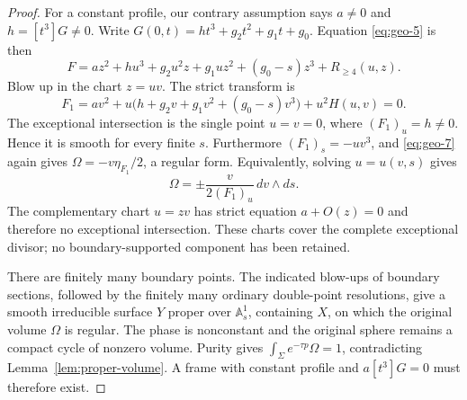 \begin{proof}
For a constant profile, our contrary assumption says \(a\neq0\) and
\(h=[t^3]G\neq0\). Write
\(G(0,t)=ht^3+g_2t^2+g_1t+g_0\).
Equation \eqref{eq:geo-5} is then
\begin{equation}\label{eq:geo-9}
F=az^2+hu^3+g_2u^2z+g_1uz^2+(g_0-s)z^3+R_{\geq4}(u,z).
\end{equation}
Blow up in the chart \(z=uv\). The strict transform is
\begin{equation}\label{eq:geo-10}
F_1=av^2+u\bigl(h+g_2v+g_1v^2+(g_0-s)v^3\bigr)
          +u^2H(u,v)=0.
\end{equation}
The exceptional intersection is the single point \(u=v=0\), where
\((F_1)_u=h\neq0\). Hence it is smooth for every finite \(s\).
Furthermore \((F_1)_s=-uv^3\), and \eqref{eq:geo-7} again gives
\(\Omega=-v\eta_{F_1}/2\), a regular form.
Equivalently, solving \(u=u(v,s)\) gives
\[
 \Omega=\pm\frac{v}{2(F_1)_u}\,dv\wedge ds.
\]
The complementary chart \(u=zv\) has strict equation \(a+O(z)=0\)
and therefore no exceptional intersection. These charts cover the
complete exceptional divisor; no boundary-supported component
has been retained.

There are finitely many boundary points. The indicated blow-ups
of boundary sections, followed by the finitely many ordinary
double-point resolutions, give a smooth irreducible surface \(Y\)
proper over \(\mathbb A^1_s\), containing \(X\), on which the original
volume \(\Omega\) is regular. The phase is nonconstant and the
original sphere remains a compact cycle of nonzero volume.
Purity gives \(\int_\Sigma e^{-\tau p}\Omega=1\), contradicting
Lemma~\ref{lem:proper-volume}.
A frame with constant profile and \(a[t^3]G=0\) must therefore exist.
\end{proof}
